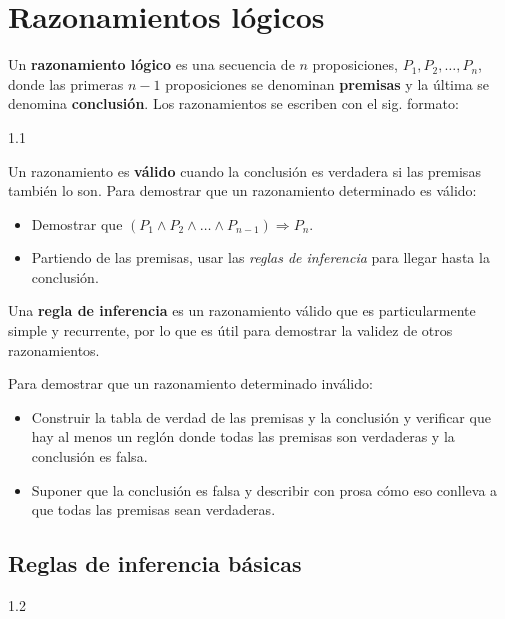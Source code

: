 \chapter{Razonamientos lógicos}

Un \textbf{razonamiento lógico} es una secuencia de \(n\) proposiciones, \(P_1,P_2,\dots,P_n\), donde las primeras \(n-1\) proposiciones se denominan \textbf{premisas} y la última se denomina \textbf{conclusión}.
Los razonamientos se escriben con el sig. formato:

1.1

Un razonamiento es \textbf{válido} cuando la conclusión es verdadera si las premisas también lo son.
Para demostrar que un razonamiento determinado es válido:
\begin{itemize}
  \item Demostrar que \((P_1\land P_2\land\dots\land P_{n-1})\Rightarrow P_n\).
  \item Partiendo de las premisas, usar las \emph{reglas de inferencia} para llegar hasta la conclusión.
\end{itemize}

Una \textbf{regla de inferencia} es un razonamiento válido que es particularmente simple y recurrente, por lo que es útil para demostrar la validez de otros razonamientos.

Para demostrar que un razonamiento determinado inválido:
\begin{itemize}
  \item Construir la tabla de verdad de las premisas y la conclusión y verificar que hay al menos un reglón donde todas las premisas son verdaderas y la conclusión es falsa.
  \item Suponer que la conclusión es falsa y describir con prosa cómo eso conlleva a que todas las premisas sean verdaderas.
\end{itemize}


\newpage
\section{Reglas de inferencia básicas}


1.2



